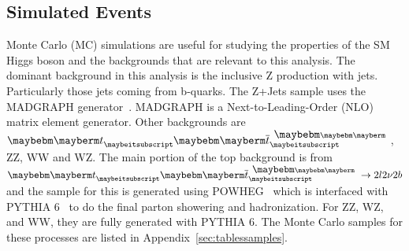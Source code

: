 




\subsection{Simulated Events}

Monte Carlo (MC) simulations are useful for studying the properties of the SM Higgs boson and the backgrounds that are relevant to this analysis.  The dominant background in this analysis is the inclusive Z production with jets. Particularly those jets coming from b-quarks.  The Z+Jets sample uses the MADGRAPH generator~\cite{MadGraph07}. MADGRAPH is a Next-to-Leading-Order (NLO) matrix element generator.  Other backgrounds are $\Pqt \Paqt$, ZZ, WW and WZ.  The main portion of the top background is from $\Pqt \Paqt \rightarrow 2l2\nu 2b$ and the sample for this is generated using POWHEG~\cite{Powheg04,Powheg07,Powheg08} which is interfaced with PYTHIA 6~\cite{pythia} to do the final parton showering and hadronization.  For ZZ, WZ, and WW, they are fully generated with PYTHIA 6.  The Monte Carlo samples for these processes are listed in Appendix~\ref{sec:tablessamples}. 

